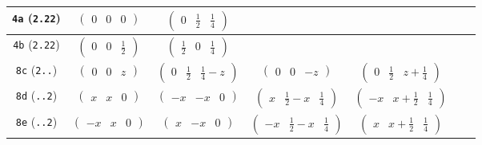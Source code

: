 \documentclass[fleqn,9pt,landscape]{jsarticle}
\begin{document}
\begin{center}
\begin{longtable}{ccccccc}
{\tt 4a} ({\tt 2.22}) & $ \begin{pmatrix} 0 & 0 & 0 \end{pmatrix} $ & $ \begin{pmatrix} 0 & \frac{1}{2} & \frac{1}{4} \end{pmatrix} $ & $  $ & $  $ & $  $ & $  $ \\ \hline
{\tt 4b} ({\tt 2.22}) & $ \begin{pmatrix} 0 & 0 & \frac{1}{2} \end{pmatrix} $ & $ \begin{pmatrix} \frac{1}{2} & 0 & \frac{1}{4} \end{pmatrix} $ & $  $ & $  $ & $  $ & $  $ \\ \hline
{\tt 8c} ({\tt 2..}) & $ \begin{pmatrix} 0 & 0 & z \end{pmatrix} $ & $ \begin{pmatrix} 0 & \frac{1}{2} & \frac{1}{4} - z \end{pmatrix} $ & $ \begin{pmatrix} 0 & 0 & - z \end{pmatrix} $ & $ \begin{pmatrix} 0 & \frac{1}{2} & z + \frac{1}{4} \end{pmatrix} $ & $  $ & $  $ \\ \hline
{\tt 8d} ({\tt ..2}) & $ \begin{pmatrix} x & x & 0 \end{pmatrix} $ & $ \begin{pmatrix} - x & - x & 0 \end{pmatrix} $ & $ \begin{pmatrix} x & \frac{1}{2} - x & \frac{1}{4} \end{pmatrix} $ & $ \begin{pmatrix} - x & x + \frac{1}{2} & \frac{1}{4} \end{pmatrix} $ & $  $ & $  $ \\ \hline
{\tt 8e} ({\tt ..2}) & $ \begin{pmatrix} - x & x & 0 \end{pmatrix} $ & $ \begin{pmatrix} x & - x & 0 \end{pmatrix} $ & $ \begin{pmatrix} - x & \frac{1}{2} - x & \frac{1}{4} \end{pmatrix} $ & $ \begin{pmatrix} x & x + \frac{1}{2} & \frac{1}{4} \end{pmatrix} $ & $  $ & $  $ \\ \hline

\end{longtable}
\end{center}
\end{document}
